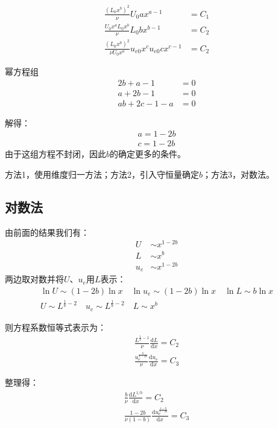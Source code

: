 \begin{align}
    \frac{(L_{0}x^{b})^{2}}{\nu}U_{0}ax^{a-1}&=C_{1}\\
    \frac{U_{0}x^{a}L_{0}x^{b}}{\nu}L_{0}bx^{b-1}&=C_{2}\\
    \frac{(L_{0}x^{b})^{2}}{\nu U_{0}x^{a}}u_{e0}x^{c}u_{e0}cx^{c-1}&=C_{2}
\end{align}

幂方程组
\begin{align}
    2b+a-1&=0\\
    a+2b-1&=0\\
    ab+2c-1-a&=0
\end{align}

解得：
\begin{align}
    a = 1-2b\\
    c = 1-2b
\end{align}
由于这组方程不封闭，因此$b$的确定更多的条件。

方法1，使用维度归一方法；方法2，引入守恒量确定$b$；方法3，对数法。

\subsection*{对数法}
由前面的结果我们有：
\begin{align}
    U&\sim x^{1-2b}\\
    L&\sim x^{b}\\
    u_{e}&\sim x^{1-2b}
\end{align}
两边取对数并将$U$、$u_{e}$用$L$表示：
\begin{align}
    \ln U\sim (1-2b)\ln x\quad\ln u_{e}\sim (1-2b)\ln x\quad\ln L\sim b\ln x\\
    U \sim L^{\frac{1}{b}-2}\quad u_{e} \sim L^{\frac{1}{b}-2}\quad L\sim x^{b}
\end{align} 

则方程系数恒等式表示为：
\begin{align}
    \frac{L^{\frac{1}{b}-1}}{\nu}\frac{\mathrm{d}L}{\mathrm{d}x}=C_{2}\\
    \frac{u_{e}^{\frac{b}{1-2b}}}{\nu}\frac{\mathrm{d}u_{e}}{\mathrm{d}x}=C_{3}
\end{align}

整理得：
\begin{align}
    \frac{b}{\nu}\frac{\mathrm{d}L^{1/b}}{\mathrm{d}x}=C_{2}\\
    \frac{1-2b}{\nu(1-b)}\frac{\mathrm{d}u_{e}^{\frac{1-b}{1-2b}}}{\mathrm{d}x}=C_{3}
\end{align}

